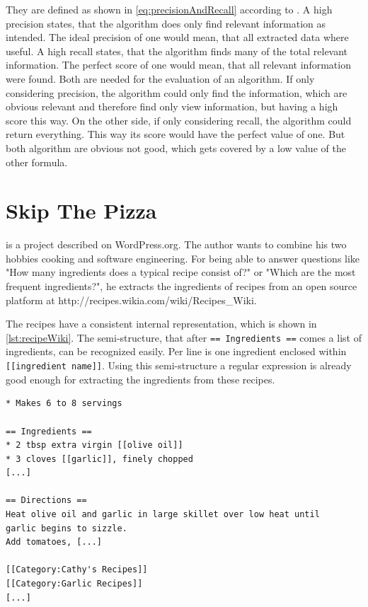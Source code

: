 \documentclass[12pt, twoside]{report}
\begin{document}
They are defined as shown in \cref{eq:precisionAndRecall} according to  \parencite{surveyOfTextMining}. A high precision states, that the algorithm does only find relevant information as intended. The ideal precision of one would mean, that all extracted data where useful. A high recall states, that the algorithm finds many of the total relevant information. The perfect score of one would mean, that all relevant information were found. Both are needed for the evaluation of an algorithm. If only considering precision, the algorithm could only find the information, which are obvious relevant and therefore find only view information, but having a high score this way. On the other side, if only considering recall, the algorithm could return everything. This way its score would have the perfect value of one. But both algorithm are obvious not good, which gets covered by a low value of the other formula.


\section{Skip The Pizza}
\parencite{REgutGenug} is a project described on WordPress.org. The author wants to combine his two hobbies cooking and software engineering. For being able to answer questions like "How many ingredients does a typical recipe consist of?" or "Which are the most frequent ingredients?", he extracts the ingredients of recipes from an open source platform at http://recipes.wikia.com/wiki/Recipes\_Wiki.

The recipes have a consistent internal representation, which is shown in \cref{lst:recipeWiki}. The semi-structure, that after \texttt{== Ingredients ==} comes a list of ingredients, can be recognized easily. Per line is one ingredient enclosed within \texttt{[[ingredient name]]}. Using this semi-structure a regular expression is already good enough for extracting the ingredients from these recipes.

\begin{lstlisting}[frame=single, basicstyle=\footnotesize\ttfamily,caption={Shortened example recipe from \\ http://recipes.wikia.com/wiki/Recipes\_Wiki}, label=lst:recipeWiki]
* Makes 6 to 8 servings

== Ingredients ==
* 2 tbsp extra virgin [[olive oil]]
* 3 cloves [[garlic]], finely chopped
[...]

== Directions ==
Heat olive oil and garlic in large skillet over low heat until
garlic begins to sizzle.
Add tomatoes, [...]

[[Category:Cathy's Recipes]]
[[Category:Garlic Recipes]]
[...]
\end{lstlisting}
\end{document}
